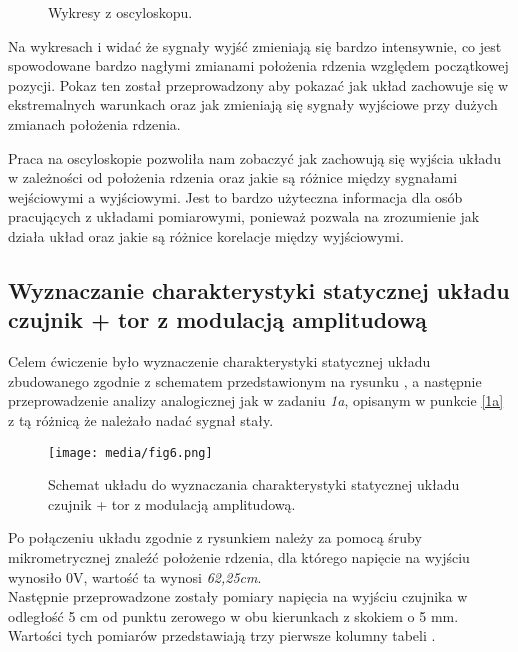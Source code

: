 \documentclass{article}
\begin{document}
\begin{figure}[!ht]
    \centering

    \caption{Wykresy z oscyloskopu.}
    \label{fig:main1}
\end{figure}


\vspace{1em}
Na wykresach  i  widać że sygnały wyjść zmieniają się bardzo intensywnie, co jest spowodowane bardzo nagłymi zmianami położenia rdzenia względem początkowej pozycji. Pokaz ten został przeprowadzony aby pokazać jak układ zachowuje się w ekstremalnych warunkach oraz jak zmieniają się sygnały wyjściowe przy dużych zmianach położenia rdzenia.

\vspace{1em}
Praca na oscyloskopie pozwoliła nam zobaczyć jak zachowują się wyjścia układu w zależności od położenia rdzenia oraz jakie są różnice między sygnałami wejściowymi a wyjściowymi. Jest to bardzo użyteczna informacja dla osób pracujących z układami pomiarowymi, ponieważ pozwala na zrozumienie jak działa układ oraz jakie są różnice korelacje między wyjściowymi.
\newpage
\subsection{Wyznaczanie charakterystyki statycznej układu czujnik + tor z modulacją amplitudową}

Celem ćwiczenie było wyznaczenie charakterystyki statycznej układu zbudowanego zgodnie z schematem przedstawionym na rysunku , a następnie przeprowadzenie analizy analogicznej jak w zadaniu \textit{1a}, opisanym w punkcie \ref{1a} z tą różnicą że należało nadać sygnał stały.

\begin{figure}[ht]
    \centering
    \texttt{[image: media/fig6.png]}
    \caption{Schemat układu do wyznaczania charakterystyki statycznej układu czujnik + tor z modulacją amplitudową.}
    \label{fig6}
\end{figure}
\newpage
Po połączeniu układu zgodnie z rysunkiem  należy za pomocą śruby mikrometrycznej znaleźć położenie rdzenia, dla którego napięcie na wyjściu wynosiło 0V, wartość ta wynosi \textit{62,25cm}.\\Następnie przeprowadzone zostały pomiary napięcia na wyjściu czujnika w odległość 5 cm od punktu zerowego w obu kierunkach z skokiem o 5 mm. Wartości tych pomiarów przedstawiają trzy pierwsze kolumny tabeli .
\end{document}
